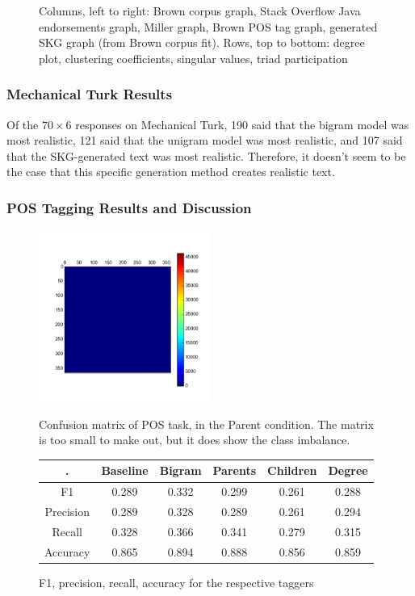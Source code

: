 \documentclass[12pt]{article}
\begin{document}
\begin{figure}
  \caption{Columns, left to right: Brown corpus graph, Stack Overflow Java endorsements graph, Miller graph, Brown POS tag graph, generated SKG graph (from Brown corpus fit). Rows, top to bottom: degree plot, clustering coefficients, singular values, triad participation}
\end{figure}

\subsubsection*{Mechanical Turk Results}

Of the $70 \times 6$ responses on Mechanical Turk, 190 said that the bigram model was most realistic, 121 said that the unigram model was most realistic, and 107 said that the SKG-generated text was most realistic. Therefore, it doesn't seem to be the case that this specific generation method creates realistic text.

\subsubsection*{POS Tagging Results and Discussion}

\begin{figure}
  \includegraphics[width=0.50\textwidth]{kron_conf_mat}
  \label{fig:confmat}
  \caption{Confusion matrix of POS task, in the Parent condition. The matrix is too small to make out, but it does show the class imbalance.}
\end{figure}

\begin{figure}
  \begin{tabular}{c || c | c | c | c | c}
    \hline
    . & Baseline & Bigram & Parents & Children & Degree \\
    \hline
    F1 & 0.289 & 0.332 & 0.299 & 0.261 & 0.288 \\
    Precision & 0.289 & 0.328 & 0.289 & 0.261 & 0.294 \\
    Recall & 0.328 & 0.366 & 0.341 & 0.279 & 0.315 \\
    Accuracy & 0.865 & 0.894 & 0.888 & 0.856 & 0.859 \\
    \hline
  \end{tabular}
  \caption{F1, precision, recall, accuracy for the respective taggers}
  \label{fig:f1s}
\end{figure}
\end{document}
